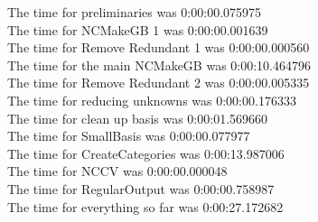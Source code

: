 \documentclass[rep10,leqno]{report}
\begin{document}
\noindent
The time for preliminaries was 0:00:00.075975\\
The time for NCMakeGB 1 was 0:00:00.001639\\
The time for Remove Redundant 1 was 0:00:00.000560\\
The time for the main NCMakeGB was 0:00:10.464796\\
The time for Remove Redundant 2 was 0:00:00.005335\\
The time for reducing unknowns was 0:00:00.176333\\
The time for clean up basis was 0:00:01.569660\\
The time for SmallBasis was 0:00:00.077977\\
The time for CreateCategories was 0:00:13.987006\\
The time for NCCV was 0:00:00.000048\\
The time for RegularOutput was 0:00:00.758987\\
The time for everything so far was 0:00:27.172682\\
\end{document}
